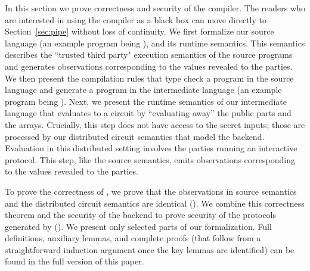 In this section we prove correctness and security of the \tool compiler.
The readers who are interested in using the compiler as a black box can
move directly to  Section~\ref{sec:pipe} without loss of continuity.
We first formalize our source language (an example program being
), and its runtime semantics.
This semantics describes the ``trusted third party"
execution semantics of the source programs and
generates observations corresponding to the values revealed to the
parties.
%
We then present the compilation rules that type check a program in the
source language and generate a program in the intermediate
language (an example program being ).
%
Next, we present the runtime semantics of our intermediate language
that evaluates to a circuit by ``evaluating away'' the public parts
and the arrays. Crucially, this step does not have access to the secret
inputs; those are processed by our distributed circuit semantics that
model the \mpc backend.
%
Evaluation in this distributed setting involves the parties running an
interactive protocol. This step, like  the source semantics, emits
observations corresponding to the values revealed to the parties.

To prove the correctness of \tool, we prove that  the observations in
source semantics and the distributed circuit semantics are identical
().
We combine this correctness theorem and the security of the \mpc
backend to prove security of the protocols generated by \tool
().
We present only selected parts of our formalization. Full definitions,
auxiliary lemmas, and complete proofs (that follow from a
straightforward induction argument once the key lemmas are
identified) can be found in the full version of this paper. %


